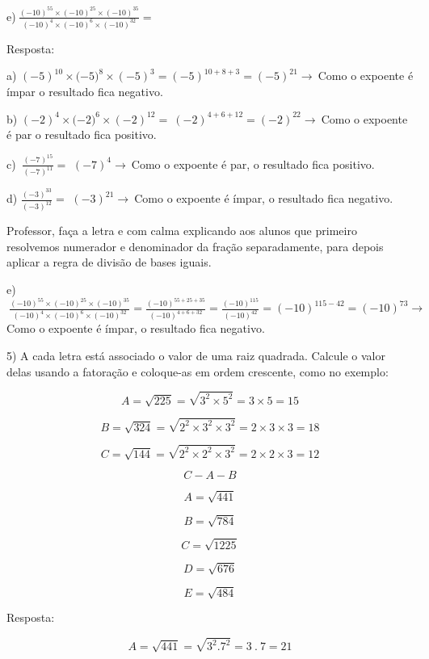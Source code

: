 e)\(\ \frac{{( - 10)}^{55} \times {( - 10)}^{25} \times {( - 10)}^{35}}{{( - 10)}^{4} \times {( - 10)}^{6} \times {( - 10)}^{32}} =\)

Resposta:

a)
\({( - 5)}^{10} \times ( - {5)}^{8} \times \left( - 5 \right)^{3} = \left( - 5 \right)^{10 + 8 + 3} = \left( - 5 \right)^{21} \rightarrow \ \)Como
o expoente é ímpar o resultado fica negativo.

b)
\({( - 2)}^{4} \times ( - {2)}^{6} \times \left( - 2 \right)^{12} = \ \left( - 2 \right)^{4 + 6 + 12} = \left( - 2 \right)^{22} \rightarrow \ \)Como
o expoente é par o resultado fica positivo.

c) \(\ \frac{{( - 7)}^{15}}{{( - 7)}^{11}} =\)
\({( - 7)}^{4} \rightarrow \ \)Como o expoente é par, o resultado fica
positivo.

d) \(\frac{{( - 3)}^{33}}{{( - 3)}^{12}} =\)
\({( - 3)}^{21} \rightarrow \ \)Como o expoente é ímpar, o resultado
fica negativo.

Professor, faça a letra e com calma explicando aos alunos que primeiro
resolvemos numerador e denominador da fração separadamente, para depois
aplicar a regra de divisão de bases iguais.

e)\(\ \frac{{( - 10)}^{55} \times {( - 10)}^{25} \times {( - 10)}^{35}}{{( - 10)}^{4} \times {( - 10)}^{6} \times {( - 10)}^{32}} = \frac{{( - 10)}^{55 + 25 + 35}}{{( - 10)}^{4 + 6 + 32}} = \frac{{( - 10)}^{115}}{{( - 10)}^{42}} = {( - 10)}^{115 - 42} = {( - 10)}^{73} \rightarrow \ \)Como
o expoente é ímpar, o resultado fica negativo.

5) A cada letra está associado o valor de uma raiz quadrada. Calcule o
valor delas usando a fatoração e coloque-as em ordem crescente, como no
exemplo:

\[A = \sqrt{225} = \sqrt{3^{2} \times 5^{2}} = 3 \times 5 = 15\]

\[B = \sqrt{324} = \sqrt{2^2 \times 3^2 \times 3^2} = 2 \times 3 \times 3 = 18\]

\[C = \sqrt{144} = \sqrt{2^2 \times 2^2 \times 3^2} = 2 \times 2 \times 3 = 12\]

\[C - A - B\]

\[A = \sqrt{441}\]

\[B = \sqrt{784}\]

\[C = \sqrt{1225}\]

\[D = \sqrt{676}\]

\[E = \sqrt{484}\]

Resposta:

\[A = \sqrt{441} = \sqrt{3^{2}.7^2} = 3\ .\ 7 = 21\]

